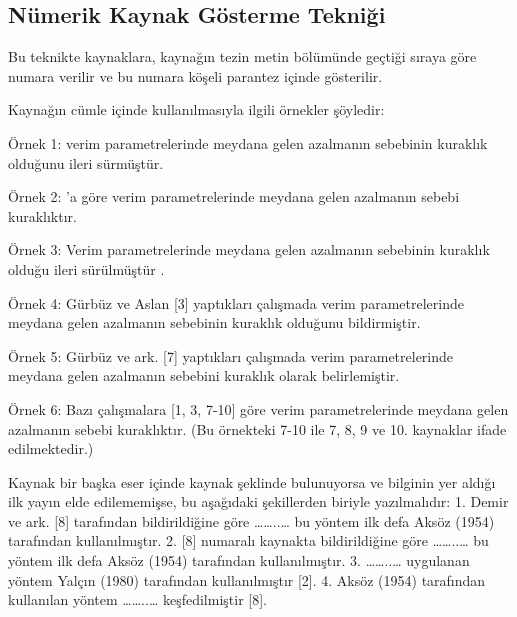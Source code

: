 \subsection{Nümerik Kaynak Gösterme Tekniği}
\noindent Bu teknikte kaynaklara, kaynağın tezin metin bölümünde geçtiği sıraya göre numara verilir ve bu numara köşeli parantez içinde gösterilir.

Kaynağın cümle içinde kullanılmasıyla ilgili örnekler şöyledir:

	Örnek 1: \citet{Olekseyuk2002} verim parametrelerinde meydana gelen azalmanın sebebinin kuraklık olduğunu ileri sürmüştür.

	Örnek 2: \citet{Olekseyuk2002}'a göre verim parametrelerinde meydana gelen azalmanın sebebi kuraklıktır.

	Örnek 3: Verim parametrelerinde meydana gelen azalmanın sebebinin kuraklık olduğu ileri sürülmüştür \parencite{Olekseyuk2002}.

	Örnek 4: Gürbüz ve Aslan [3] yaptıkları çalışmada verim parametrelerinde meydana gelen azalmanın sebebinin 
	kuraklık olduğunu bildirmiştir.
	
	Örnek 5: Gürbüz ve ark. [7] yaptıkları çalışmada verim parametrelerinde meydana gelen azalmanın sebebini kuraklık olarak belirlemiştir.
	
	Örnek 6: Bazı çalışmalara [1, 3, 7-10] göre verim parametrelerinde meydana gelen azalmanın sebebi kuraklıktır. (Bu örnekteki 7-10 ile 7, 8, 9 ve 10. kaynaklar ifade edilmektedir.)
	
	Kaynak bir başka eser içinde kaynak şeklinde bulunuyorsa ve bilginin yer aldığı ilk yayın elde edilememişse, bu aşağıdaki şekillerden biriyle yazılmalıdır:
	1.	Demir ve ark. [8] tarafından bildirildiğine göre ……..… bu yöntem ilk defa Aksöz (1954) tarafından kullanılmıştır.
	2.	[8] numaralı kaynakta bildirildiğine göre ……..… bu yöntem ilk defa Aksöz (1954) tarafından kullanılmıştır.
	3.	……..… uygulanan yöntem Yalçın (1980) tarafından kullanılmıştır [2].
	4.	Aksöz (1954) tarafından kullanılan yöntem ……..… keşfedilmiştir [8].
	





